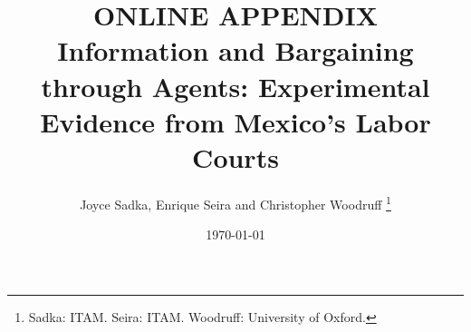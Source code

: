 \documentclass[11pt]{article}
\begin{document}
\title{ONLINE APPENDIX \\
Information and Bargaining through Agents: Experimental Evidence from Mexico's Labor Courts}

\author{Joyce Sadka, Enrique Seira and Christopher Woodruff \thanks{Sadka: ITAM. 
Seira: ITAM. Woodruff: University of Oxford.}}

\date{ \today }

\maketitle


\appendix
{}


\setcounter{table}{0}
\renewcommand{\thetable}{A\arabic{table}}

\setcounter{figure}{0}
\renewcommand{\thefigure}{A\arabic{figure}}

\setcounter{section}{0}
\renewcommand\thesection{A\arabic{section}}
\renewcommand\thesubsection{\thesection\arabic{subsection}}



\newpage


\setcounter{table}{0}
\renewcommand{\thetable}{B\arabic{table}}

\setcounter{figure}{0}
\renewcommand{\thefigure}{B\arabic{figure}}

\setcounter{section}{0}
\renewcommand\thesection{B\arabic{section}}
\renewcommand\thesubsection{\thesection\arabic{subsection}}




\newpage

\setcounter{table}{0}
\renewcommand{\thetable}{C\arabic{table}}

\setcounter{figure}{0}
\renewcommand{\thefigure}{C\arabic{figure}}

\setcounter{section}{0}
\renewcommand\thesection{C\arabic{section}}
\renewcommand\thesubsection{\thesection\arabic{subsection}}








\end{document}
